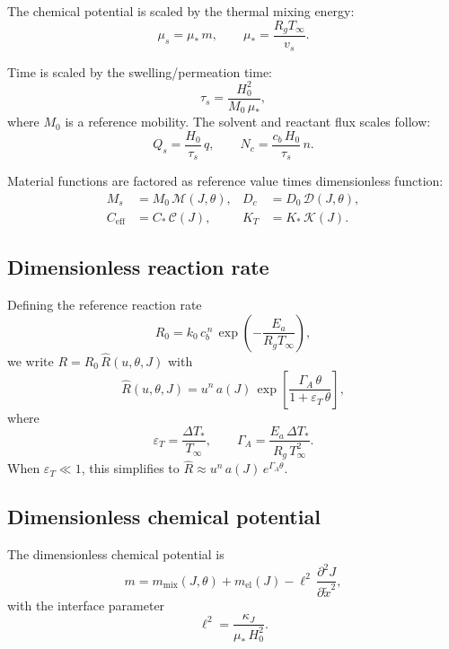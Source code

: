 \documentclass[aps,pre,reprint,superscriptaddress,longbibliography,floatfix]{revtex4-2}
\newcommand{\Ms}{\mathcal{M}}
\newcommand{\Ds}{\mathcal{D}}
\newcommand{\Cs}{\mathcal{C}}
\newcommand{\Ks}{\mathcal{K}}
\newcommand{\Rhat}{\widehat{R}}
\begin{document}
The chemical potential is scaled by the thermal mixing energy:
\begin{equation}
  \mu_s = \mu_*\,m, \qquad \mu_* = \frac{R_g T_\infty}{v_s}.
\end{equation}

Time is scaled by the swelling/permeation time:
\begin{equation}
  \tau_s = \frac{H_0^2}{M_0\,\mu_*},
\end{equation}
where $M_0$ is a reference mobility. The solvent and reactant flux scales follow:
\begin{equation}
  Q_s = \frac{H_0}{\tau_s}\,q,
  \qquad
  N_c = \frac{c_b\,H_0}{\tau_s}\,n.
\end{equation}

Material functions are factored as reference value times dimensionless function:
\begin{align}
  M_s &= M_0\,\Ms(J,\theta), &
  D_c &= D_0\,\Ds(J,\theta), \\
  C_\mathrm{eff} &= C_*\,\Cs(J), &
  K_T &= K_*\,\Ks(J).
\end{align}

\subsection{Dimensionless reaction rate}

Defining the reference reaction rate
\begin{equation}
  R_0 = k_0\,c_b^{\,n}\,\exp\!\left(-\frac{E_a}{R_g T_\infty}\right),
\end{equation}
we write $R = R_0\,\Rhat(u,\theta,J)$ with
\begin{equation}
  \Rhat(u,\theta,J)
  = u^n\,a(J)\,
  \exp\!\left[\frac{\Gamma_A\,\theta}{1+\varepsilon_T\,\theta}\right],
  \label{eq:Rhat}
\end{equation}
where
\begin{equation}
  \varepsilon_T = \frac{\Delta T_*}{T_\infty},
  \qquad
  \Gamma_A = \frac{E_a\,\Delta T_*}{R_g\,T_\infty^2}.
  \label{eq:epsT_GammaA}
\end{equation}
When $\varepsilon_T \ll 1$, this simplifies to $\Rhat \approx u^n\,a(J)\,e^{\Gamma_A\theta}$.

\subsection{Dimensionless chemical potential}

The dimensionless chemical potential is
\begin{equation}
  m = m_\mathrm{mix}(J,\theta) + m_\mathrm{el}(J) - \ell^2\,\frac{\partial^2 J}{\partial \tilde{x}^2},
  \label{eq:m_nondim}
\end{equation}
with the interface parameter
\begin{equation}
  \ell^2 = \frac{\kappa_J}{\mu_*\,H_0^2}.
\end{equation}
\end{document}
